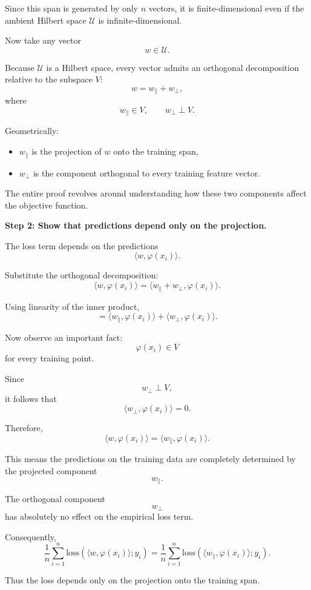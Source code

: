 \documentclass[11pt]{article}
\begin{document}
\begin{enumerate}
\begin{solutionbox}
Since this span is generated by only $n$ vectors, it is finite-dimensional even if the ambient Hilbert space $\mathcal U$ is infinite-dimensional.

Now take any vector
\[
w\in\mathcal U.
\]

Because $\mathcal U$ is a Hilbert space, every vector admits an orthogonal decomposition relative to the subspace $V$:
\[
w=w_{\parallel}+w_{\perp},
\]
where
\[
w_{\parallel}\in V,
\qquad
w_{\perp}\perp V.
\]

Geometrically:
\begin{itemize}
    \item $w_{\parallel}$ is the projection of $w$ onto the training span,
    \item $w_{\perp}$ is the component orthogonal to every training feature vector.
\end{itemize}

The entire proof revolves around understanding how these two components affect the objective function.

\medskip

\textbf{Step 2: Show that predictions depend only on the projection.}

The loss term depends on the predictions
\[
\langle w,\varphi(x_i)\rangle.
\]

Substitute the orthogonal decomposition:
\[
\langle w,\varphi(x_i)\rangle
=
\langle
w_{\parallel}+w_{\perp},
\varphi(x_i)
\rangle.
\]

Using linearity of the inner product,
\[
=
\langle w_{\parallel},\varphi(x_i)\rangle
+
\langle w_{\perp},\varphi(x_i)\rangle.
\]

Now observe an important fact:
\[
\varphi(x_i)\in V
\]
for every training point.

Since
\[
w_{\perp}\perp V,
\]
it follows that
\[
\langle w_{\perp},\varphi(x_i)\rangle=0.
\]

Therefore,
\[
\langle w,\varphi(x_i)\rangle
=
\langle w_{\parallel},\varphi(x_i)\rangle.
\]

This means the predictions on the training data are completely determined by the projected component
\[
w_{\parallel}.
\]

The orthogonal component
\[
w_{\perp}
\]
has absolutely no effect on the empirical loss term.

Consequently,
\[
\frac1n
\sum_{i=1}^n
\mathrm{loss}(\langle w,\varphi(x_i)\rangle;y_i)
=
\frac1n
\sum_{i=1}^n
\mathrm{loss}(\langle w_{\parallel},\varphi(x_i)\rangle;y_i).
\]

Thus the loss depends only on the projection onto the training span.


\end{solutionbox}
\end{enumerate}
\end{document}
